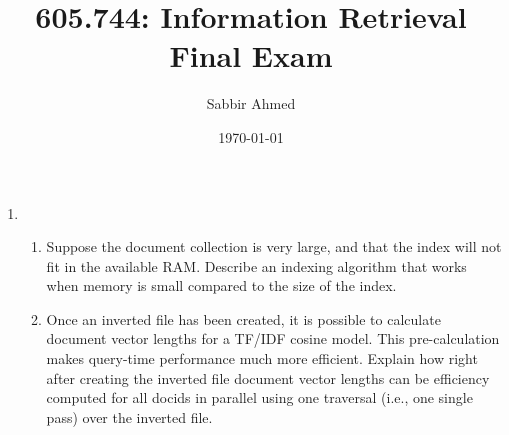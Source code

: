 \documentclass[11pt]{article}
\title{605.744: Information Retrieval \\ Final Exam}
\author{Sabbir Ahmed}
\date{\today}
\begin{document}
\maketitle
\begin{enumerate}

  \item \begin{enumerate}
          \item Suppose the document collection is very large, and that the index will not fit in the available RAM. Describe an indexing algorithm that works when memory is small compared to the size of the index.

          \item Once an inverted file has been created, it is possible to calculate document vector lengths for a TF/IDF cosine model. This pre-calculation makes query-time performance much more efficient. Explain how right after creating the inverted file document vector lengths can be efficiency computed for all docids in parallel using one traversal (i.e., one single pass) over the inverted file.
        \end{enumerate}




\end{enumerate}
\end{document}
